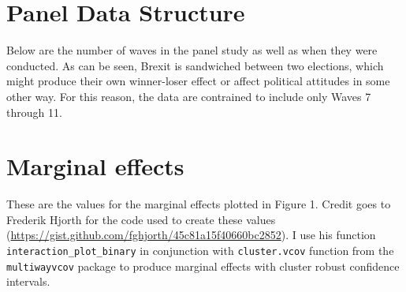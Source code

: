 \documentclass[12pt, letter]{article}
\begin{document}
\section{Panel Data Structure}

Below are the number of waves in the panel study as well as when they were conducted. As can be seen, Brexit is sandwiched between two elections, which might produce their own winner-loser effect or affect political attitudes in some other way. For this reason, the data are contrained to include only Waves 7 through 11. 

\begin{center}
\end{center}

\section{Marginal effects} \label{marginaleffects}

These are the values for the marginal effects plotted in Figure 1. Credit goes to Frederik Hjorth for the code used to create these values (\url{https://gist.github.com/fghjorth/45c81a15f40660bc2852}). I use his function \texttt{interaction\_plot\_binary} in conjunction with \texttt{cluster.vcov} function from the \texttt{multiwayvcov} package to produce marginal effects with cluster robust confidence intervals.
\end{document}

